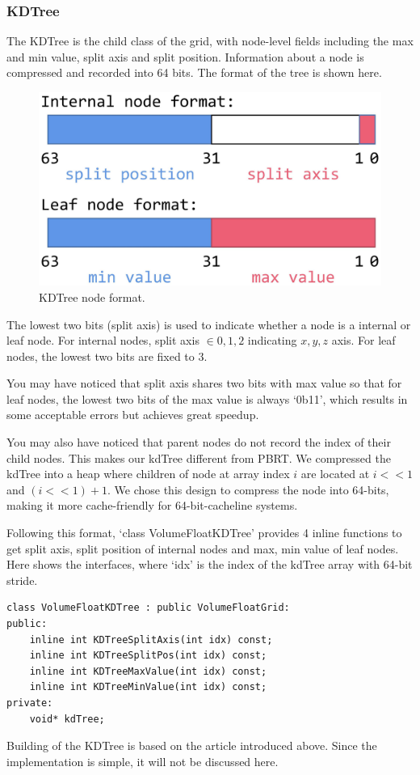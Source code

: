 \documentclass[acmtog]{acmart}
\begin{document}
\subsubsection{KDTree}
        The KDTree is the child class of the grid, with node-level fields including the max and min value, split axis and split position.
    Information about a node is compressed and recorded into 64 bits.
    The format of the tree is shown here.
\begin{figure}[H]
    \includegraphics[scale=0.065]{pictures/kdTree format.png}
    \centering
    \caption{KDTree node format.}
\end{figure}
        The lowest two bits (split axis) is used to indicate whether a node is a internal or leaf node.
    For internal nodes, split axis $\in { 0, 1, 2 }$ indicating ${ x, y, z }$ axis.
    For leaf nodes, the lowest two bits are fixed to $3$.\par
        You may have noticed that split axis shares two bits with max value so that
    for leaf nodes, the lowest two bits of the max value is always `0b11', 
    which results in some acceptable errors but achieves great speedup.\par
        You may also have noticed that parent nodes do not record the index of their child nodes.
    This makes our kdTree different from PBRT.
    We compressed the kdTree into a heap where children of node at array index $i$ are located at $i<<1$ and $(i<<1)+1$.
    We chose this design to compress the node into 64-bits, making it more cache-friendly for 64-bit-cacheline systems.\par
        Following this format, `class VolumeFloatKDTree' provides 4 inline functions to
    get split axis, split position of internal nodes and max, min value of leaf nodes.
    Here shows the interfaces, where `idx' is the index of the kdTree array with 64-bit stride.
\begin{lstlisting}
class VolumeFloatKDTree : public VolumeFloatGrid:
public:
    inline int KDTreeSplitAxis(int idx) const;
    inline int KDTreeSplitPos(int idx) const;
    inline int KDTreeMaxValue(int idx) const;
    inline int KDTreeMinValue(int idx) const;
private:
    void* kdTree;
\end{lstlisting}
        Building of the KDTree is based on the article introduced above.
    Since the implementation is simple, it will not be discussed here.
\end{document}
